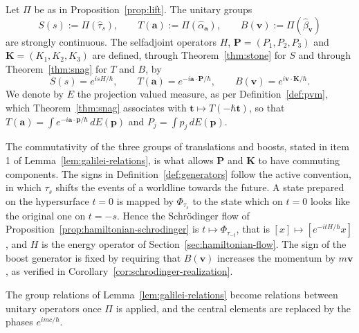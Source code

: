 \begin{definition}\label{def:generators}
	Let $\Pi$ be as in Proposition~\ref{prop:lift}. The unitary groups
	\begin{equation}
		S(s):=\Pi(\hat\tau_s), \qquad T(\mathbf{a}):=\Pi(\hat\alpha_{\mathbf{a}}), \qquad B(\mathbf{v}):=\Pi(\hat\beta_{\mathbf{v}})
	\end{equation}
	are strongly continuous. The selfadjoint operators $H$, $\mathbf{P}=(P_1,P_2,P_3)$ and $\mathbf{K}=(K_1,K_2,K_3)$ are defined, through Theorem~\ref{thm:stone} for $S$ and through Theorem~\ref{thm:snag} for $T$ and $B$, by
	\begin{equation}
		S(s)=e^{isH/\hbar}, \qquad T(\mathbf{a})=e^{-i\mathbf{a}\cdot\mathbf{P}/\hbar}, \qquad B(\mathbf{v})=e^{i\mathbf{v}\cdot\mathbf{K}/\hbar}.
	\end{equation}
	We denote by $E$ the projection valued measure, as per Definition~\ref{def:pvm}, which Theorem~\ref{thm:snag} associates with $\mathbf{t}\mapsto T(-\hbar\mathbf{t})$, so that $T(\mathbf{a})=\int e^{-i\mathbf{a}\cdot\mathbf{p}/\hbar}\,dE(\mathbf{p})$ and $P_j=\int p_j\,dE(\mathbf{p})$.
\end{definition}

\begin{remark}\label{rem:active-convention}
	The commutativity of the three groups of translations and boosts, stated in item 1 of Lemma~\ref{lem:galilei-relations}, is what allows $\mathbf{P}$ and $\mathbf{K}$ to have commuting components. The signs in Definition~\ref{def:generators} follow the active convention, in which $\tau_s$ shifts the events of a worldline towards the future. A state prepared on the hypersurface $t=0$ is mapped by $\Phi_{\tau_s}$ to the state which on $t=0$ looks like the original one on $t=-s$. Hence the Schrödinger flow of Proposition~\ref{prop:hamiltonian-schrodinger} is $t\mapsto\Phi_{\tau_{-t}}$, that is $[x]\mapsto[e^{-itH/\hbar}x]$, and $H$ is the energy operator of Section~\ref{sec:hamiltonian-flow}. The sign of the boost generator is fixed by requiring that $B(\mathbf{v})$ increases the momentum by $m\mathbf{v}$, as verified in Corollary~\ref{cor:schrodinger-realization}.
\end{remark}

The group relations of Lemma~\ref{lem:galilei-relations} become relations between unitary operators once $\Pi$ is applied, and the central elements are replaced by the phases $e^{imc/\hbar}$.

